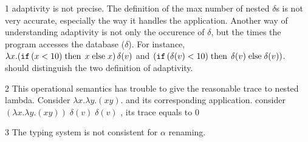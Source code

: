 \begin{mainitem}
\item[1] adaptivity is not precise. The definition of the max number
  of nested $\delta$s is not very accurate, especially the way it handles the
  application. Another way of understanding adaptivity is not only the
  occurence of $\delta$, but the times the program accesses the
  database ($\delta$).  For instance, $\lambda
  x. ( \mathtt{if} \, (x < 10 ) \mbox{\;then\;} \, x \mbox{\;else\;} x  ) \, \delta(v) $ and $
   ( \mathtt{if} \, ( \delta(v) < 10 ) \mbox{\;then\;} \, \delta(v) \mbox{\;else\;} \delta(v)  )
   $. should distinguish the two definition of adaptivity. \\
\item[2] This operational semantics has trouble to give the reasonable trace to
  nested lambda. Consider $\lambda x. \lambda y. (x y)$.  and its corresponding 
  application.  consider $ (  \lambda x. \lambda y. (x y) ) \;  \delta(v)  \; \delta(v) $ , its trace equals to 0 \\
\item[3] The typing system is not consistent for $\alpha$ renaming.
  \end{mainitem}